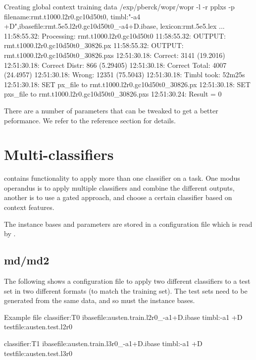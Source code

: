 \documentclass[a4paper,10pt,twoside]{report}
\begin{document}
\begin{bash}{Creating global context training data}
/exp/pberck/wopr/wopr -l -r pplxs -p filename:rmt.t1000.l2r0.gc10d50t0,
              timbl:"-a4 +D",ibasefile:rmt.5e5.l2r0.gc10d50t0_-a4+D.ibase,
              lexicon:rmt.5e5.lex
...
11:58:55.32: Processing: rmt.t1000.l2r0.gc10d50t0
11:58:55.32: OUTPUT:     rmt.t1000.l2r0.gc10d50t0_30826.px
11:58:55.32: OUTPUT:     rmt.t1000.l2r0.gc10d50t0_30826.pxs
12:51:30.18:  Correct:       3141 (19.2016)
12:51:30.18:  Correct Distr: 866 (5.29405)
12:51:30.18:  Correct Total: 4007 (24.4957)
12:51:30.18:  Wrong:         12351 (75.5043)
12:51:30.18:  Timbl took: 52m25s
12:51:30.18:  SET px_file to rmt.t1000.l2r0.gc10d50t0_30826.px
12:51:30.18:  SET pxs_file to rmt.t1000.l2r0.gc10d50t0_30826.pxs
12:51:30.24: Result = 0
\end{bash}

There are a number of parameters that can be tweaked to get a better
peformance. We refer to the reference section for details.

\section{Multi-classifiers}

\Wopr{} contains functionality to apply more than one classifier on a
task. One modus operandus is to apply multiple classifiers and combine
the different outputs, another is to use a gated approach, and choose
a certain classifier based on context features.

The instance bases and parameters are stored in a configuration file
which is read by \wopr{}.

\subsection{md/md2} %


The following shows a configuration file to apply two different
classifiers to a test set in two different formats (to match the
training set). The test sets need to be generated from the same data,
and so must the instance bases.

\begin{wout}{Example  file}%
classifier:T0
ibasefile:austen.train.l2r0_-a1+D.ibase
timbl:-a1 +D
testfile:austen.test.l2r0

classifier:T1
ibasefile:austen.train.l3r0_-a1+D.ibase
timbl:-a1 +D
testfile:austen.test.l3r0
\end{wout}
\end{document}
